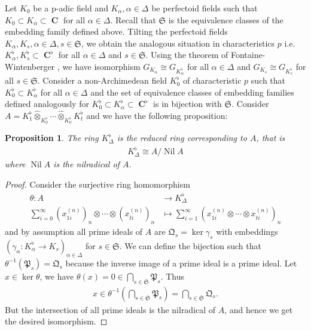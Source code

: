 \documentclass[12pts,a4paper]{amsart}
\newtheorem{proposition}{Proposition}[section]
\DeclareMathOperator{\Nil}{Nil}
\DeclareMathOperator{\C}{\textbf{C}}
\begin{document}
Let $K_0$ be a p-adic field and $K_\alpha, \alpha\in\Delta$ be perfectoid fields such that $K_0\subset K_\alpha\subset \C$ for all $\alpha\in\Delta$. Recall that $\mathfrak{S}$ is the equivalence classes of the embedding family defined above. Tilting the perfectoid fields $K_\alpha,K_s, \alpha\in\Delta,s\in\mathfrak{S}$, we obtain the analogous situation in characteristics $p$ i.e. $K^\flat_\alpha, K^\flat_s\subset \C^\flat$ for all $\alpha\in\Delta$ and $s\in\mathfrak{S}$. Using the theorem of Fontaine-Wintenberger \cite{FonWin}, we have isomorphism $G_{K_\alpha}\cong G_{K^\flat_\alpha}$ for all $\alpha\in\Delta$ and $G_{K_s}\cong G_{K^\flat_s}$ for all $s\in\mathfrak{S}$. Consider a non-Archimedean field $K^\flat_0$ of characteristic $p$ such that $K^\flat_0\subset K^\flat_\alpha$ for all $\alpha\in\Delta$ and the set of equivalence classes of embedding families defined analogously for $K^\flat_0\subset K^\flat_\alpha\subset \C^\flat$ is in bijection with $\mathfrak{S}$. Consider $A=K^\flat_1\hat{\otimes}_{K^\flat_0}\cdots\hat{\otimes}_{K^\flat_0} K^\flat_t$ and we have the following proposition:

\begin{proposition}
    The ring $K^\flat_\Delta$ is the reduced ring corresponding to $A$, that is
    \begin{align*}
        K^\flat_\Delta\cong A/\Nil A
    \end{align*}
    where $\Nil A$ is the nilradical of $A$.
\end{proposition}

\begin{proof}
    Consider the surjective ring homomorphism
    \begin{align*}
        \theta: A&\to K^\flat_\Delta\\
        \sum\limits_{i=0}^\infty (x^{(n)}_{1i})_n\otimes\cdots\otimes (x^{(n)}_{ti})_n&\mapsto \sum\limits_{i=1}^\infty (x^{(n)}_{1i}\otimes\cdots\otimes x^{(n)}_{ti})_n
    \end{align*}
    and by assumption all prime ideals of $A$ are $\mathfrak{Q}_s=\ker\gamma_s$ with embeddings $(\gamma_\alpha: K^\flat_\alpha\to K_s)_{\alpha\in\Delta}$ for $s\in\mathfrak{S}$. We can define the bijection such that $\theta^{-1}(\mathfrak{P}_s)=\mathfrak{Q}_s$ because the inverse image of a prime ideal is a prime ideal. Let $x\in\ker\theta$, we have $\theta(x)=0\in\bigcap\limits_{s\in\mathfrak{S}}\mathfrak{P}_s$. Thus 
    \begin{align*}
        x\in \theta^{-1}\left(\bigcap\limits_{s\in\mathfrak{S}}\mathfrak{P}_s\right)=\bigcap\limits_{s\in\mathfrak{S}}\mathfrak{Q}_s.
    \end{align*}
    But the intersection of all prime ideals is the nilradical of $A$, and hence we get the desired isomorphism.
\end{proof}
\end{document}
